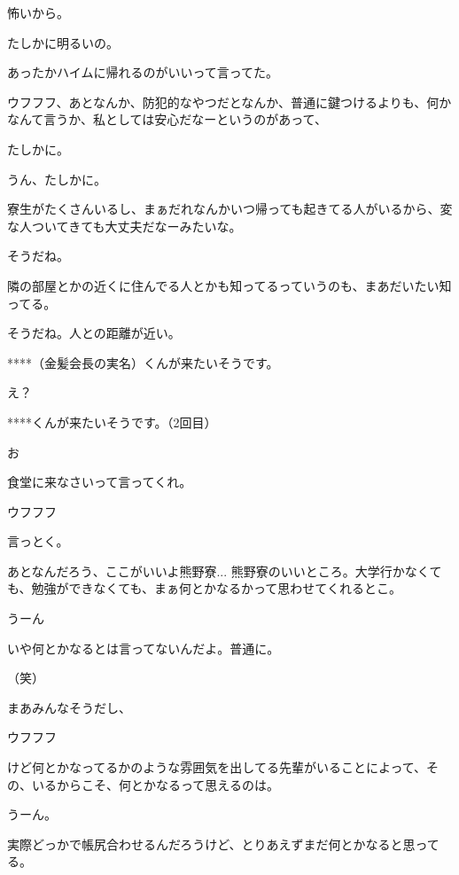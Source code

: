 \begin{multicols}{3}
{        怖いから。

        たしかに明るいの。

        あったかハイムに帰れるのがいいって言ってた。

        ウフフフ、あとなんか、防犯的なやつだとなんか、普通に鍵つけるよりも、何かなんて言うか、私としては安心だなーというのがあって、

        たしかに。

        うん、たしかに。

        寮生がたくさんいるし、まぁだれなんかいつ帰っても起きてる人がいるから、変な人ついてきても大丈夫だなーみたいな。

        そうだね。

        隣の部屋とかの近くに住んでる人とかも知ってるっていうのも、まあだいたい知ってる。

        そうだね。人との距離が近い。

        ****（金髪会長の実名）くんが来たいそうです。

        え？

        ****くんが来たいそうです。（2回目）

        お

        食堂に来なさいって言ってくれ。

        ウフフフ

        言っとく。

        あとなんだろう、ここがいいよ熊野寮... 熊野寮のいいところ。大学行かなくても、勉強ができなくても、まぁ何とかなるかって思わせてくれるとこ。

        うーん

        いや何とかなるとは言ってないんだよ。普通に。

        （笑）

        まあみんなそうだし、

        ウフフフ

        けど何とかなってるかのような雰囲気を出してる先輩がいることによって、その、いるからこそ、何とかなるって思えるのは。

        うーん。

        実際どっかで帳尻合わせるんだろうけど、とりあえずまだ何とかなると思ってる。

}
\end{multicols}

